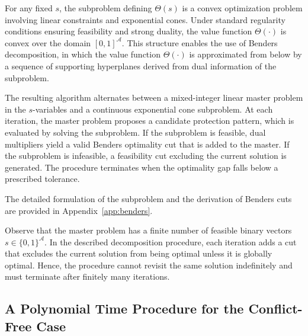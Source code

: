 \documentclass[letter,11pt, reqno]{amsart}
\newtheorem{theorem}{Theorem}
\begin{document}
For any fixed $s$, the subproblem defining $\Theta(s)$ is a convex optimization
problem involving linear constraints and exponential cones. Under standard
regularity conditions ensuring feasibility and strong duality, the value
function $\Theta(\cdot)$ is convex over the domain $[0,1]^{\mathcal{A}}$.
This structure enables the use of Benders decomposition, in which the value function $\Theta(\cdot)$ 
is approximated from below by a sequence of supporting hyperplanes derived from
dual information of the subproblem.

The resulting algorithm alternates between a mixed-integer linear  master problem in the
$s$-variables and a continuous exponential cone subproblem.
At each iteration, the master problem proposes a candidate protection pattern,
which is evaluated by solving the subproblem. If the subproblem is feasible,
dual multipliers yield a valid Benders optimality cut that is added to the master.
If the subproblem is infeasible, a feasibility cut excluding the current
solution is generated. The procedure terminates when the optimality gap falls
below a prescribed tolerance.

The detailed formulation of the subproblem and the derivation of Benders cuts are provided in Appendix~\ref{app:benders}.



Observe that the master problem has a finite number of feasible binary vectors
$s\in\{0,1\}^{\mathcal A}$.
In the described decomposition procedure, each iteration adds a cut that excludes the current solution from being optimal
unless it is globally optimal.
Hence, the procedure cannot revisit the same solution indefinitely and must
terminate after finitely many iterations.


\subsection{A Polynomial Time Procedure for the Conflict-Free Case}
\end{document}
